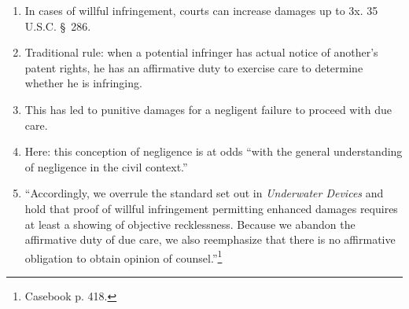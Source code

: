 \begin{enumerate}
    \item In cases of willful infringement, courts can increase damages up to 
    3x. 35 U.S.C. \S\ 286.
    \item Traditional rule: when a potential infringer has actual notice of 
    another's patent rights, he has an affirmative duty to exercise care to 
    determine whether he is infringing.
    \item This has led to punitive damages for a negligent failure to proceed 
    with due care.
    \item Here: this conception of negligence is at odds ``with the general 
    understanding of negligence in the civil context.''
    \item ``Accordingly, we overrule the standard set out in \emph{Underwater 
    Devices} and hold that proof of willful infringement permitting enhanced 
    damages requires at least a showing of objective recklessness. Because we 
    abandon the affirmative duty of due care, we also reemphasize that there 
    is no affirmative obligation to obtain opinion of 
    counsel.''\footnote{Casebook p. 418.} 
\end{enumerate}
